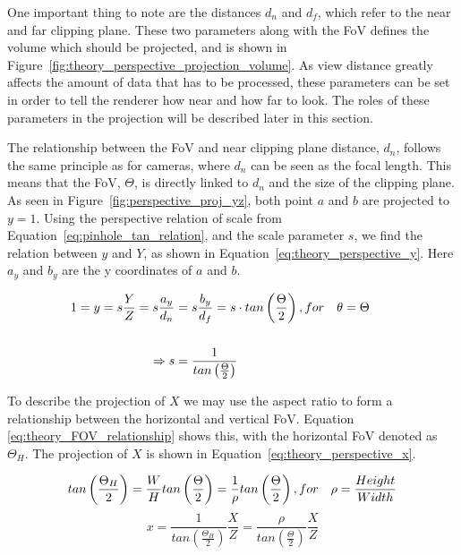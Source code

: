 One important thing to note are the distances $d_n$ and $d_f$, which refer to the near and far clipping plane. These two parameters along with the FoV defines the volume which should be projected, and is shown in Figure~\ref{fig:theory_perspective_projection_volume}. As view distance greatly affects the amount of data that has to be processed, these parameters can be set in order to tell the renderer how near and how far to look. The roles of these parameters in the projection will be described later in this section.

The relationship between the FoV and near clipping plane distance, $d_n$, follows the same principle as for cameras, where $d_n$ can be seen as the focal length. This means that the FoV, $\Theta$, is directly linked to $d_n$ and the size of the clipping plane. As seen in Figure~\ref{fig:perspective_proj_yz}, both point $a$ and $b$ are projected to $y=1$. Using the perspective relation of scale from Equation~\eqref{eq:pinhole_tan_relation}, and the scale parameter $s$, we find the relation between $y$ and $Y$, as shown in Equation~\eqref{eq:theory_perspective_y}. Here $a_y$ and $b_y$ are the y coordinates of $a$ and $b$.

\begin{equation}
    \begin{aligned}
        1 = y = s \frac{Y}{Z} = s \frac{a_y}{d_n} &= s \frac{b_y}{d_f} = s \cdot tan\left(\frac{\Theta}{2}\right) \hfil,for \quad \theta = \Theta \\\\
        \Rightarrow s &= \frac{1}{tan\left(\frac{\Theta}{2}\right)} &&
        \label{eq:theory_perspective_y}
    \end{aligned}
\end{equation}

To describe the projection of $X$ we may use the aspect ratio to form a relationship between the horizontal and vertical FoV. Equation \eqref{eq:theory_FOV_relationship} shows this, with the horizontal FoV denoted as $\Theta_H$. The projection of $X$ is shown in Equation~\eqref{eq:theory_perspective_x}.


\begin{equation}
    tan\left(\frac{\Theta_H}{2}\right) = \frac{W}{H}tan\left(\frac{\Theta}{2}\right) = \frac{1}{\rho}tan\left(\frac{\Theta}{2}\right) \hfill, for \quad \rho = \frac{Height}{Width}
    \label{eq:theory_FOV_relationship}
\end{equation}
\begin{equation}
    x = \frac{1}{tan\left(\frac{\Theta_H}{2}\right)}\frac{X}{Z} = \frac{\rho}{tan\left(\frac{\Theta}{2}\right)}\frac{X}{Z}
    \label{eq:theory_perspective_x}
\end{equation}


